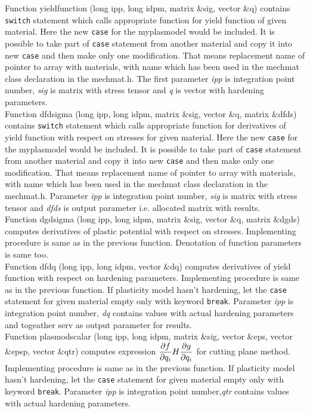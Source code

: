 Function {\sf yieldfunction (long ipp, long idpm, matrix \&sig, vector \&q)} contains {\tt switch} statement which calls
appropriate function for yield function of given material. Here the new {\tt case} for the  {\sf myplasmodel} would
be included. It is possible to take part of {\tt case} statement from another material and copy it into new {\tt case}
and then make only one modification. That means replacement name of pointer to array with materials, with name which
has been used in the {\sf mechmat} class declaration in the mechmat.h. The first parameter {\it ipp} is integration
point number, {\it sig} is matrix with stress tensor and {\it q} is vector with hardening parameters.\\

Function {\sf dfdsigma (long ipp, long idpm, matrix \&sig, vector \&q, matrix \&dfds)} contains {\tt switch} statement
which calls appropriate function for derivatives of yield function with respect on stresses for given material. Here
the new {\tt case} for the  {\sf myplasmodel} would be included. It is possible to take part of {\tt case} statement
from another material and copy it into new {\tt case} and then make only one modification. That means replacement name
of pointer to array with materials, with name which has been used in the {\sf mechmat} class declaration
in the mechmat.h. Parameter {\it ipp} is integration point number, {\it sig} is matrix with stress tensor and
{\it dfds} is output parameter i.e. allocated matrix with results.\\

Function {\sf dgdsigma (long ipp, long idpm, matrix \&sig, vector \&q, matrix \&dgds)} computes derivatives of plastic
potential with respect on stresses. Implementing procedure is same as in the previous function. Denotation of function
parameters is same too.\\

Function {\sf dfdq (long ipp, long idpm, vector \&dq)} computes derivatives of yield function with respect on hardening
parameters. Implementing procedure is same as in the previous function. If plasticity model hasn't hardening, let
the {\tt case} statement for given material empty only with keyword {\tt break}. Parameter {\it ipp} is integration
point number, {\it dq} contains values with actual hardening parameters and togeather serv as output parameter for results.\\

Function {\sf plasmodscalar (long ipp, long idpm, matrix \&sig, vector \&eps, vector \&epsp, vector \&qtr)} computes
expression $\mbox{$\displaystyle\frac{\partial{f}}{\partial{q_i}}$}H\mbox{$\displaystyle\frac{\partial{g}}{\partial{q_i}}$}$ for cutting plane method. Implementing procedure is same as in the previous function.
If plasticity model hasn't hardening, let the {\tt case} statement for given material empty only with keyword {\tt break}.
Parameter {\it ipp} is integration point number,{\it qtr} contains values with actual hardening parameters.\\

